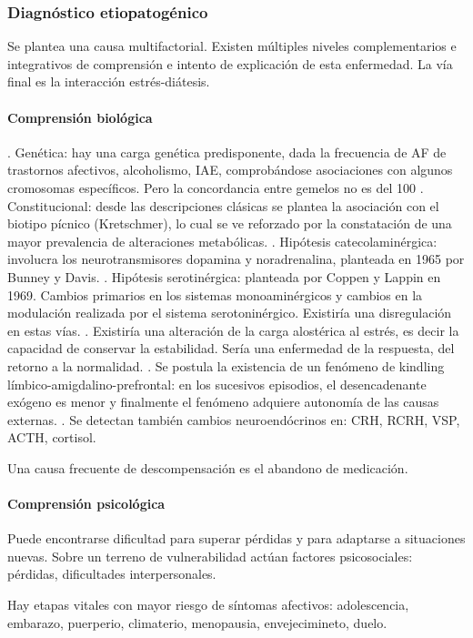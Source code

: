 \subsubsection*{Diagnóstico etiopatogénico}
Se plantea una causa multifactorial. Existen múltiples niveles complementarios e integrativos de comprensión e intento de explicación de esta enfermedad. La vía final es la interacción estrés-diátesis.
\paragraph{Comprensión biológica}
. Genética: hay una carga genética predisponente, dada la frecuencia de AF de trastornos afectivos, alcoholismo, IAE, comprobándose asociaciones con algunos cromosomas específicos. Pero la concordancia entre gemelos no es del 100%
. Constitucional: desde las descripciones clásicas se plantea la asociación con el biotipo pícnico (Kretschmer), lo cual se ve reforzado por la constatación de una mayor prevalencia de alteraciones metabólicas.
. Hipótesis catecolaminérgica: involucra los neurotransmisores dopamina y noradrenalina, planteada en 1965 por Bunney y Davis.
. Hipótesis serotinérgica: planteada por Coppen y Lappin en 1969. Cambios primarios en los sistemas monoaminérgicos y cambios en la modulación realizada por el sistema serotoninérgico. Existiría una disregulación en estas vías.
. Existiría una alteración de la carga alostérica al estrés, es decir la capacidad de conservar la estabilidad. Sería una enfermedad de la respuesta, del retorno a la normalidad.
. Se postula la existencia de un fenómeno de kindling límbico-amigdalino-prefrontal: en los sucesivos episodios, el desencadenante exógeno es menor y finalmente el fenómeno adquiere autonomía de las causas externas.
. Se detectan también cambios neuroendócrinos en: CRH, RCRH, VSP, ACTH, cortisol.

Una causa frecuente de descompensación es el abandono de medicación.
\paragraph{Comprensión psicológica}
Puede encontrarse dificultad para superar pérdidas y para adaptarse a situaciones nuevas. Sobre un terreno de vulnerabilidad actúan factores psicosociales: pérdidas, dificultades interpersonales.

Hay etapas vitales con mayor riesgo de síntomas afectivos: adolescencia, embarazo, puerperio, climaterio, menopausia, envejecimineto, duelo.
